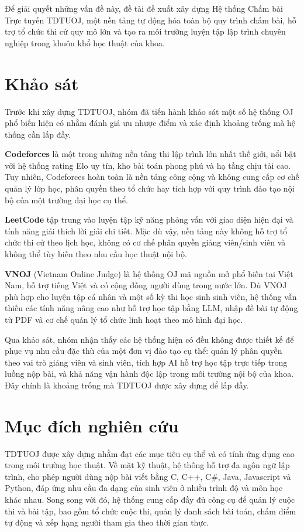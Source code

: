 \documentclass[12pt, a4paper]{report}
\begin{document}
Để giải quyết những vấn đề này, đề tài đề xuất xây dựng Hệ thống Chấm bài Trực tuyến
TDTUOJ, một nền tảng tự động hóa toàn bộ quy trình chấm bài, hỗ trợ tổ chức thi cử quy
mô lớn và tạo ra môi trường luyện tập lập trình chuyên nghiệp trong khuôn khổ học thuật
của khoa.

\section{Khảo sát}

Trước khi xây dựng TDTUOJ, nhóm đã tiến hành khảo sát một số hệ thống \ac{OJ} phổ biến
hiện có nhằm đánh giá ưu nhược điểm và xác định khoảng trống mà hệ thống cần lấp đầy.

\textbf{Codeforces} là một trong những nền tảng thi lập trình lớn nhất thế giới, nổi bật
với hệ thống rating Elo uy tín, kho bài toán phong phú và hạ tầng chịu tải cao. Tuy nhiên,
Codeforces hoàn toàn là nền tảng công cộng và không cung cấp cơ chế quản lý lớp học, phân
quyền theo tổ chức hay tích hợp với quy trình đào tạo nội bộ của một trường đại học cụ
thể.

\textbf{LeetCode} tập trung vào luyện tập kỹ năng phỏng vấn với giao diện hiện đại và tính
năng giải thích lời giải chi tiết. Mặc dù vậy, nền tảng này không hỗ trợ tổ chức thi cử
theo lịch học, không có cơ chế phân quyền giảng viên/sinh viên và không thể tùy biến
theo nhu cầu học thuật nội bộ.

\textbf{VNOJ} (Vietnam Online Judge) là hệ thống \ac{OJ} mã nguồn mở phổ biến tại Việt
Nam, hỗ trợ tiếng Việt và có cộng đồng người dùng trong nước lớn. Dù VNOJ phù hợp cho
luyện tập cá nhân và một số kỳ thi học sinh sinh viên, hệ thống vẫn thiếu các tính năng
nâng cao như hỗ trợ học tập bằng \ac{LLM}, nhập đề bài tự động từ \ac{PDF} và cơ chế quản
lý tổ chức linh hoạt theo mô hình đại học.

Qua khảo sát, nhóm nhận thấy các hệ thống hiện có đều không được thiết kế để phục vụ nhu
cầu đặc thù của một đơn vị đào tạo cụ thể: quản lý phân quyền theo vai trò giảng viên và
sinh viên, tích hợp \ac{AI} hỗ trợ học tập trực tiếp trong luồng nộp bài, và khả năng vận
hành độc lập trong môi trường nội bộ của khoa. Đây chính là khoảng trống mà TDTUOJ
được xây dựng để lấp đầy.

\section{Mục đích nghiên cứu}

TDTUOJ được xây dựng nhằm đạt các mục tiêu cụ thể và có tính ứng dụng cao trong môi trường học thuật. Về
mặt kỹ thuật, hệ thống hỗ trợ đa ngôn ngữ lập trình, cho phép người dùng nộp bài viết bằng
C, C++, C\#, Java, Javascript và Python, đáp ứng nhu cầu đa dạng của sinh viên ở nhiều trình 
độ và môn học khác nhau. Song song với đó, hệ thống cung cấp đầy đủ công cụ để quản lý cuộc 
thi và bài tập, bao gồm tổ chức cuộc thi, quản lý danh sách bài toán, chấm điểm tự động và 
xếp hạng người tham gia theo thời gian thực.
\end{document}

